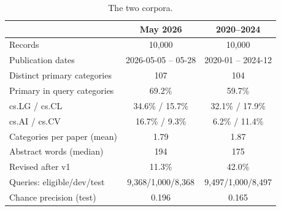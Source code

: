 \begin{table}[!t]
\centering
\caption{The two corpora.}
\label{tab:data}
\footnotesize
\setlength{\tabcolsep}{3pt}
\begin{tabular}{@{}lcc@{}}
\toprule
 & May 2026 & 2020--2024 \\
\midrule
Records & 10{,}000 & 10{,}000 \\
Publication dates & 2026-05-05 -- 05-28 & 2020-01 -- 2024-12 \\
Distinct primary categories & 107 & 104 \\
Primary in query categories & 69.2\% & 59.7\% \\
\quad cs.LG / cs.CL & 34.6\% / 15.7\% & 32.1\% / 17.9\% \\
\quad cs.AI / cs.CV & 16.7\% / 9.3\% & 6.2\% / 11.4\% \\
Categories per paper (mean) & 1.79 & 1.87 \\
Abstract words (median) & 194 & 175 \\
Revised after v1 & 11.3\% & 42.0\% \\
Queries: eligible/dev/test & 9{,}368/1{,}000/8{,}368 & 9{,}497/1{,}000/8{,}497 \\
Chance precision (test) & 0.196 & 0.165 \\
\bottomrule
\end{tabular}
\end{table}
